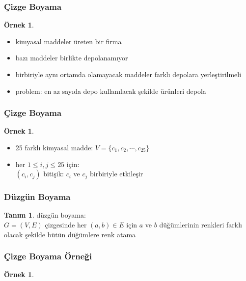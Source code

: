 \documentclass[dvipsnames]{beamer}
\theoremstyle{definition}
\newtheorem{tanim}[theorem]{Tanım}
\theoremstyle{example}
\newtheorem{ornek}[theorem]{Örnek}
\theoremstyle{plain}
\begin{document}
\begin{frame}
  \frametitle{Çizge Boyama}

  \begin{ornek}
    \begin{itemize}
      \item kimyasal maddeler üreten bir firma
      \item bazı maddeler birlikte depolanamıyor
      \item birbiriyle aynı ortamda olamayacak maddeler farklı depolara
        yerleştirilmeli

      \pause
      \medskip
      \item \alert{problem}: en az sayıda depo kullanılacak şekilde ürünleri
        depola
    \end{itemize}
  \end{ornek}
\end{frame}

\begin{frame}
  \frametitle{Çizge Boyama}

  \begin{ornek}
    \begin{itemize}
      \item 25 farklı kimyasal madde: $V = \{ c_1, c_2,\cdots, c_{25}\}$
      \item her $1 \leq i, j \leq 25$ için:\\
        $(c_i,c_j)$ bitişik: $c_i$ ve $c_j$ birbiriyle etkileşir
    \end{itemize}

    \begin{center}
    \end{center}
  \end{ornek}
\end{frame}

\begin{frame}
  \frametitle{Düzgün Boyama}

  \begin{tanim}
    \alert{düzgün boyama}:\\
      $G=(V,E)$ çizgesinde her $(a,b) \in E$ için $a$ ve $b$ düğümlerinin
      renkleri farklı olacak şekilde bütün düğümlere renk atama
  \end{tanim}
\end{frame}

\begin{frame}
  \frametitle{Çizge Boyama Örneği}

  \begin{ornek}
    \begin{center}
    \end{center}
  \end{ornek}
\end{frame}
\end{document}
